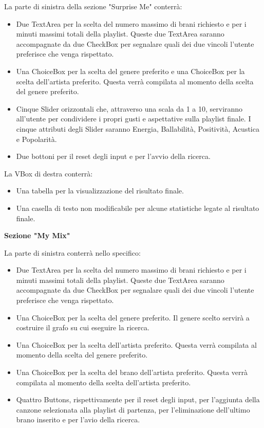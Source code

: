 \documentclass[12pt, a4paper]{article}
\begin{document}
La parte di sinistra della sezione "Surprise Me" conterrà:
\begin{itemize}
\item Due TextArea per la scelta del numero massimo di brani richiesto e per i minuti massimi totali della playlist. Queste due TextArea saranno accompagnate da due CheckBox per segnalare quali dei due vincoli l’utente preferisce che venga rispettato.
\item Una ChoiceBox per la scelta del genere preferito e una ChoiceBox per la scelta dell’artista preferito. Questa verrà compilata al momento della scelta del genere preferito.
\item Cinque Slider orizzontali che, attraverso una scala da 1 a 10, serviranno all’utente per condividere i propri gusti e aspettative sulla playlist finale. I cinque attributi degli Slider saranno Energia, Ballabilità, Positività, Acustica e Popolarità.
\item Due bottoni per il reset degli input e per l’avvio della ricerca.
\end{itemize}
\newpage
La VBox di destra conterrà:
\begin{itemize}
\item Una tabella per la visualizzazione del risultato finale.
\item Una casella di testo non modificabile per alcune statistiche legate al risultato finale.
\end{itemize}

\textbf{Sezione "My Mix"}

La parte di sinistra conterrà nello specifico:
\begin{itemize}
\item Due TextArea per la scelta del numero massimo di brani richiesto e per i minuti massimi totali della playlist. Queste due TextArea saranno accompagnate da due CheckBox per segnalare quali dei due vincoli l’utente preferisce che venga rispettato.
\item Una ChoiceBox per la scelta del genere preferito. Il genere scelto servirà a costruire il grafo su cui eseguire la ricerca.
\item Una ChoiceBox per la scelta dell’artista preferito. Questa verrà compilata al momento della scelta del genere preferito.
\item Una ChoiceBox per la scelta del brano dell'artista preferito. Questa verrà compilata al momento della scelta dell'artista preferito.
\item Quattro Buttons, rispettivamente per il reset degli input, per l'aggiunta della canzone selezionata alla playlist di partenza, per l'eliminazione dell'ultimo brano inserito e per l'avio della ricerca.
\end{itemize}
\end{document}
